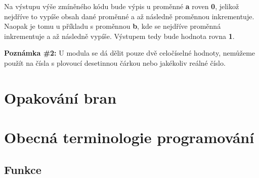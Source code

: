 \documentclass[twoside,a4paper]{article} %
\begin{document}


Na výstupu výše zmíněného kódu bude výpis u proměnné \textbf{a} roven \textbf{0}, jelikož nejdříve to vypíše obsah dané proměnné a až následně proměnnou inkrementuje. Naopak je tomu u příkladu s proměnnou \textbf{b}, kde se nejdříve proměnná inkrementuje a až následně vypíše. Výstupem tedy bude hodnota rovna \textbf{1}.

\textbf{Poznámka \#2:} U modula se dá dělit pouze dvě celočíselné hodnoty, nemůžeme použít na čísla s plovoucí desetinnou čárkou nebo jakékoliv reálné číslo.

\section{Opakování bran}

\section{Obecná terminologie programování}
\subsection{Funkce}


\newpage

\newpage
{}
\printbibliography
\nocite{*}
\end{document}
